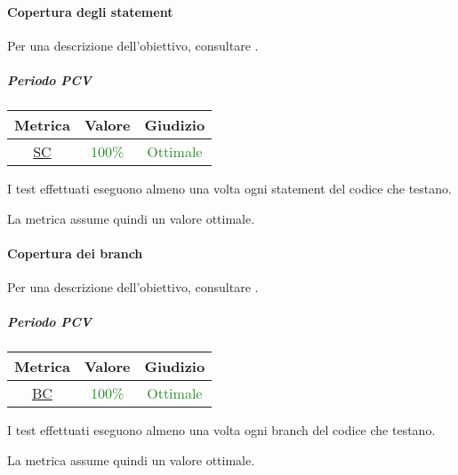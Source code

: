 			\paragraph{Copertura degli statement}
			Per una descrizione dell'obiettivo, consultare .
				\subparagraph{Periodo PCV}
				
				\begin{table}[H]
					\centering
					\begin{tabular}{  c | c | c}
						\hline
						\textbf{Metrica} & \textbf{Valore} & \textbf{Giudizio} \\
						\hline
						\hyperref[MMC]{SC}   & \textcolor{ForestGreen}{100\%}          & \textcolor{ForestGreen}{Ottimale}  \\ \hline
					\end{tabular} 
				\end{table}
			I test effettuati eseguono almeno una volta ogni statement del codice che testano. 
			
			La metrica assume quindi un valore ottimale.
			\newpage
			\paragraph{Copertura dei branch}
			Per una descrizione dell'obiettivo, consultare .
				\subparagraph{Periodo PCV}
				
				\begin{table}[H]
					\centering
					\begin{tabular}{  c | c | c}
						\hline
						\textbf{Metrica} & \textbf{Valore} & \textbf{Giudizio} \\
						\hline
						\hyperref[MMC]{BC}   & \textcolor{ForestGreen}{100\%}          & \textcolor{ForestGreen}{Ottimale}  \\ \hline
					\end{tabular} 
				\end{table}
			
			I test effettuati eseguono almeno una volta ogni branch del codice che testano. 
			
			La metrica assume quindi un valore ottimale.
			
			
			
			
			
			
				
					